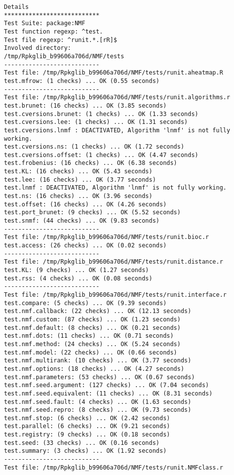 \documentclass[10pt]{article}
\begin{document}
\begin{verbatim}
Details 
*************************** 
Test Suite: package:NMF 
Test function regexp: ^test. 
Test file regexp: ^runit.*.[rR]$ 
Involved directory: 
/tmp/Rpkglib_b99606a706d/NMF/tests 
--------------------------- 
Test file: /tmp/Rpkglib_b99606a706d/NMF/tests/runit.aheatmap.R 
test.mfrow: (1 checks) ... OK (0.55 seconds)
--------------------------- 
Test file: /tmp/Rpkglib_b99606a706d/NMF/tests/runit.algorithms.r 
test.brunet: (16 checks) ... OK (3.85 seconds)
test.cversions.brunet: (1 checks) ... OK (1.33 seconds)
test.cversions.lee: (1 checks) ... OK (1.31 seconds)
test.cversions.lnmf : DEACTIVATED, Algorithm 'lnmf' is not fully working.
test.cversions.ns: (1 checks) ... OK (1.72 seconds)
test.cversions.offset: (1 checks) ... OK (4.47 seconds)
test.frobenius: (16 checks) ... OK (6.38 seconds)
test.KL: (16 checks) ... OK (5.43 seconds)
test.lee: (16 checks) ... OK (3.77 seconds)
test.lnmf : DEACTIVATED, Algorithm 'lnmf' is not fully working.
test.ns: (16 checks) ... OK (3.96 seconds)
test.offset: (16 checks) ... OK (4.26 seconds)
test.port_brunet: (9 checks) ... OK (5.52 seconds)
test.snmf: (44 checks) ... OK (9.83 seconds)
--------------------------- 
Test file: /tmp/Rpkglib_b99606a706d/NMF/tests/runit.bioc.r 
test.access: (26 checks) ... OK (0.02 seconds)
--------------------------- 
Test file: /tmp/Rpkglib_b99606a706d/NMF/tests/runit.distance.r 
test.KL: (9 checks) ... OK (1.27 seconds)
test.rss: (4 checks) ... OK (0.08 seconds)
--------------------------- 
Test file: /tmp/Rpkglib_b99606a706d/NMF/tests/runit.interface.r 
test.compare: (5 checks) ... OK (9.39 seconds)
test.nmf.callback: (22 checks) ... OK (12.13 seconds)
test.nmf.custom: (87 checks) ... OK (1.23 seconds)
test.nmf.default: (8 checks) ... OK (0.21 seconds)
test.nmf.dots: (11 checks) ... OK (0.71 seconds)
test.nmf.method: (24 checks) ... OK (5.24 seconds)
test.nmf.model: (22 checks) ... OK (0.66 seconds)
test.nmf.multirank: (10 checks) ... OK (3.77 seconds)
test.nmf.options: (18 checks) ... OK (4.27 seconds)
test.nmf.parameters: (53 checks) ... OK (0.67 seconds)
test.nmf.seed.argument: (127 checks) ... OK (7.04 seconds)
test.nmf.seed.equivalent: (11 checks) ... OK (8.31 seconds)
test.nmf.seed.fault: (4 checks) ... OK (1.63 seconds)
test.nmf.seed.repro: (8 checks) ... OK (9.73 seconds)
test.nmf.stop: (6 checks) ... OK (2.42 seconds)
test.parallel: (6 checks) ... OK (9.21 seconds)
test.registry: (9 checks) ... OK (0.18 seconds)
test.seed: (33 checks) ... OK (0.16 seconds)
test.summary: (3 checks) ... OK (1.92 seconds)
--------------------------- 
Test file: /tmp/Rpkglib_b99606a706d/NMF/tests/runit.NMFclass.r 

\end{verbatim}
\end{document}
